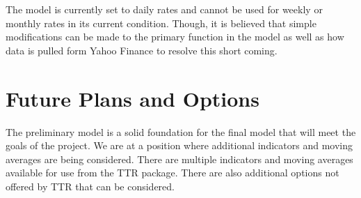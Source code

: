 \documentclass[11pt]{article}
\begin{document}
The model is currently set to daily rates and cannot be used for weekly or monthly rates in its current condition. Though, it is believed that simple modifications can be made to the primary function in the model as well as how data is pulled form Yahoo Finance to resolve this short coming.

\section*{\hspace{-.5cm} Future Plans and Options}\label{FP}
The preliminary model is a solid foundation for the final model that will meet the goals of the project. We are at a position where additional indicators and moving averages are being considered. There are multiple indicators and moving averages available for use from the TTR package. There are also additional options not offered by TTR that can be considered.
\end{document}
